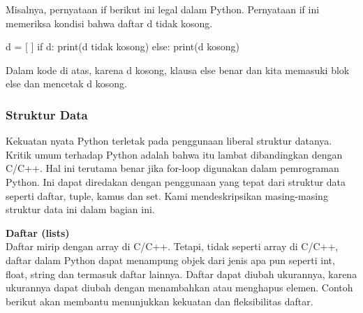 \documentclass[
  letterpaper,
  DIV=11,
  numbers=noendperiod]{scrreprt}
\newenvironment{Shaded}{\begin{snugshade}}{\end{snugshade}}
\newcommand{\BuiltInTok}[1]{\textcolor[rgb]{0.00,0.23,0.31}{#1}}
\newcommand{\ControlFlowTok}[1]{\textcolor[rgb]{0.00,0.23,0.31}{#1}}
\newcommand{\NormalTok}[1]{\textcolor[rgb]{0.00,0.23,0.31}{#1}}
\newcommand{\OperatorTok}[1]{\textcolor[rgb]{0.37,0.37,0.37}{#1}}
\newcommand{\StringTok}[1]{\textcolor[rgb]{0.13,0.47,0.30}{#1}}
\begin{document}
Misalnya, pernyataan if berikut ini legal dalam Python. Pernyataan if
ini memeriksa kondisi bahwa daftar d tidak kosong.

\begin{Shaded}
\begin{Highlighting}[]
\NormalTok{d }\OperatorTok{=}\NormalTok{ [ ]}
\ControlFlowTok{if}\NormalTok{ d:}
    \BuiltInTok{print}\NormalTok{(}\StringTok{\textquotesingle{}d tidak kosong\textquotesingle{}}\NormalTok{)}
\ControlFlowTok{else}\NormalTok{:}
    \BuiltInTok{print}\NormalTok{(}\StringTok{\textquotesingle{}d kosong\textquotesingle{}}\NormalTok{)}
\end{Highlighting}
\end{Shaded}

Dalam kode di atas, karena d kosong, klausa else benar dan kita memasuki
blok else dan mencetak d kosong.

\hypertarget{struktur-data}{%
\subsubsection*{Struktur Data}\label{struktur-data}}

Kekuatan nyata Python terletak pada penggunaan liberal struktur datanya.
Kritik umum terhadap Python adalah bahwa itu lambat dibandingkan dengan
C/C++. Hal ini terutama benar jika for-loop digunakan dalam pemrograman
Python. Ini dapat diredakan dengan penggunaan yang tepat dari struktur
data seperti daftar, tuple, kamus dan set. Kami mendeskripsikan
masing-masing struktur data ini dalam bagian ini.

\textbf{Daftar (lists)}\\
Daftar mirip dengan array di C/C++. Tetapi, tidak seperti array di
C/C++, daftar dalam Python dapat menampung objek dari jenis apa pun
seperti int, float, string dan termasuk daftar lainnya. Daftar dapat
diubah ukurannya, karena ukurannya dapat diubah dengan menambahkan atau
menghapus elemen. Contoh berikut akan membantu menunjukkan kekuatan dan
fleksibilitas daftar.
\end{document}
